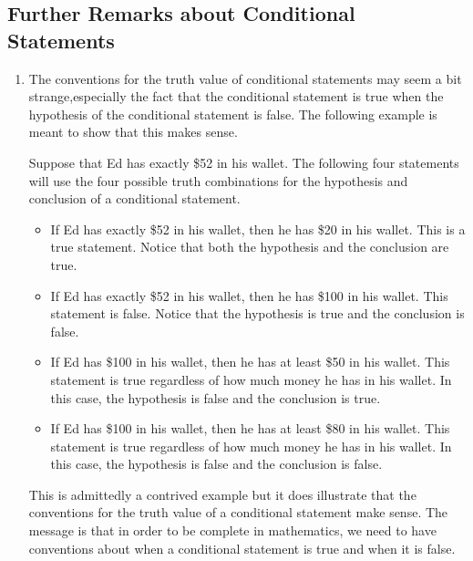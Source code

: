 \subsection*{Further Remarks about Conditional Statements}
\begin{enumerate}
\item The conventions for the truth value of conditional statements may seem a bit strange,especially the fact that the conditional statement is true when the hypothesis of the conditional statement is false.  The following example is meant to show that this makes sense.

Suppose that Ed has exactly \$52 in his wallet.  The following four statements will use the four possible truth combinations for the hypothesis and conclusion of a conditional statement.
\begin{itemize}
  \item If Ed has exactly \$52 in his wallet, then he has \$20 in his wallet.  This is a true statement.  Notice that both the hypothesis and the conclusion are true.
  \item If Ed has exactly \$52 in his wallet, then he has \$100 in his wallet.  This statement is false.  Notice that the hypothesis is true and the conclusion is false.
  \item If Ed has \$100 in his wallet, then he has at least  \$50 in his wallet.  This statement is true regardless of how much money he has in his wallet.  In this case, the hypothesis is false and the conclusion is true.
  \item If Ed has \$100 in his wallet, then he has at least  \$80 in his wallet.  This statement is true regardless of how much money he has in his wallet.  In this case, the hypothesis is false and the conclusion is false.
\end{itemize}
This is admittedly a contrived example but it does illustrate that the conventions for the truth value of a conditional statement make sense.  The message is that in order to be complete in mathematics, we need to have conventions about when a conditional statement is true and when it is false.  %


\end{enumerate}
